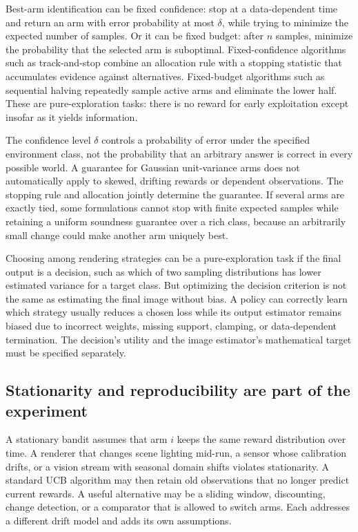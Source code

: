 Best-arm identification can be fixed confidence: stop at a data-dependent time and return an arm with error probability at most \(\delta\), while trying to minimize the expected number of samples. Or it can be fixed budget: after \(n\) samples, minimize the probability that the selected arm is suboptimal. Fixed-confidence algorithms such as track-and-stop combine an allocation rule with a stopping statistic that accumulates evidence against alternatives. Fixed-budget algorithms such as sequential halving repeatedly sample active arms and eliminate the lower half. These are pure-exploration tasks: there is no reward for early exploitation except insofar as it yields information.

The confidence level \(\delta\) controls a probability of error under the specified environment class, not the probability that an arbitrary answer is correct in every possible world. A guarantee for Gaussian unit-variance arms does not automatically apply to skewed, drifting rewards or dependent observations. The stopping rule and allocation jointly determine the guarantee. If several arms are exactly tied, some formulations cannot stop with finite expected samples while retaining a uniform soundness guarantee over a rich class, because an arbitrarily small change could make another arm uniquely best.

Choosing among rendering strategies can be a pure-exploration task if the final output is a decision, such as which of two sampling distributions has lower estimated variance for a target class. But optimizing the decision criterion is not the same as estimating the final image without bias. A policy can correctly learn which strategy usually reduces a chosen loss while its output estimator remains biased due to incorrect weights, missing support, clamping, or data-dependent termination. The decision's utility and the image estimator's mathematical target must be specified separately.

\subsection{Stationarity and reproducibility are part of the experiment}\label{03-visual-computing-i-ch012-stationarity-and-reproducibility-are-part-of-the-experiment}

A stationary bandit assumes that arm \(i\) keeps the same reward distribution over time. A renderer that changes scene lighting mid-run, a sensor whose calibration drifts, or a vision stream with seasonal domain shifts violates stationarity. A standard UCB algorithm may then retain old observations that no longer predict current rewards. A useful alternative may be a sliding window, discounting, change detection, or a comparator that is allowed to switch arms. Each addresses a different drift model and adds its own assumptions.

